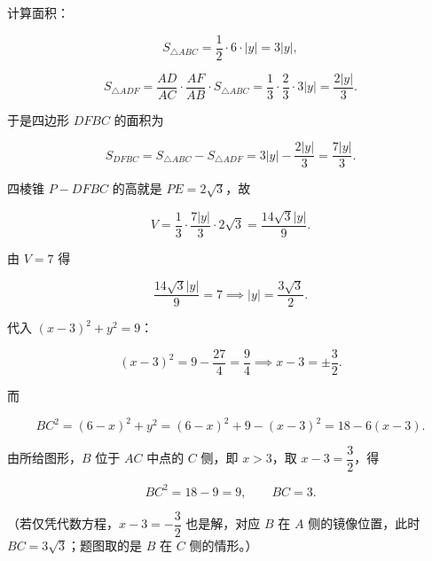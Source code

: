 \begin{answer}
计算面积：

\nopagebreak[4]
\[
S_{\triangle ABC}=\frac{1}{2}\cdot 6\cdot|y|=3|y|,
\]

\nopagebreak[4]
\[
S_{\triangle ADF}=\frac{AD}{AC}\cdot\frac{AF}{AB}\cdot S_{\triangle ABC}
=\frac{1}{3}\cdot\frac{2}{3}\cdot 3|y|
=\frac{2|y|}{3}.
\]

于是四边形 $DFBC$ 的面积为

\nopagebreak[4]
\[
S_{DFBC}=S_{\triangle ABC}-S_{\triangle ADF}
=3|y|-\frac{2|y|}{3}
=\frac{7|y|}{3}.
\]

四棱锥 $P-DFBC$ 的高就是 $PE=2\sqrt{3}$，故

\nopagebreak[4]
\[
V=\frac{1}{3}\cdot\frac{7|y|}{3}\cdot 2\sqrt{3}
=\frac{14\sqrt{3}|y|}{9}.
\]

由 $V=7$ 得

\nopagebreak[4]
\[
\frac{14\sqrt{3}|y|}{9}=7
\implies
|y|=\frac{3\sqrt{3}}{2}.
\]

代入 $(x-3)^{2}+y^{2}=9$：

\nopagebreak[4]
\[
(x-3)^{2}=9-\frac{27}{4}=\frac{9}{4}
\implies
x-3=\pm\frac{3}{2}.
\]

而

\nopagebreak[4]
\[
BC^{2}=(6-x)^{2}+y^{2}
=(6-x)^{2}+9-(x-3)^{2}
=18-6(x-3).
\]

由所给图形，$B$ 位于 $AC$ 中点的 $C$ 侧，即 $x>3$，取 $x-3=\dfrac{3}{2}$，得

\nopagebreak[4]
\[
BC^{2}=18-9=9,\qquad BC=3.
\]

（若仅凭代数方程，$x-3=-\dfrac{3}{2}$ 也是解，对应 $B$ 在 $A$ 侧的镜像位置，此时 $BC=3\sqrt{3}$；题图取的是 $B$ 在 $C$ 侧的情形。）



\end{answer}
